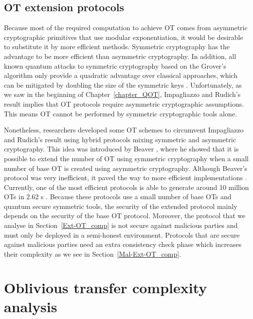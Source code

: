 \subsection{OT extension protocols} \label{Ext-OT}

Because most of the required computation to achieve OT comes from asymmetric cryptographic primitives that use modular exponentiation, it would be desirable to substitute it by more efficient methods. Symmetric cryptography has the advantage to be more efficient than asymmetric cryptography. In addition, all known quantum attacks to symmetric cryptography based on the Grover's algorithm only provide a quadratic advantage over classical approaches, which can be mitigated by doubling the size of the symmetric keys \cite{Bernstein2017}. Unfortunately, as we saw in the beginning of Chapter~\ref{chapter_QOT}, Impagliazzo and Rudich's result \cite{IR99} implies that OT protocols require asymmetric cryptographic assumptions. This means OT cannot be performed by symmetric cryptographic tools alone.

Nonetheless, researchers developed some OT schemes to circumvent Impagliazzo and Rudich's result using hybrid protocols mixing symmetric and asymmetric cryptography. This idea was introduced by Beaver \cite{B96}, where he showed that it is possible to extend the number of OT using symmetric cryptography when a small number of base OT is created using asymmetric cryptography. Although Beaver's protocol was very inefficient, it paved the way to more efficient implementations \cite{IKNP03, N07, NNOB12, ALSZ13, ALSZ15}. Currently, one of the most efficient protocols is able to generate around 10 million OTs in $2.62$ s \cite{ALSZ13}. Because these protocols use a small number of base OTs and quantum secure symmetric tools, the security of the extended protocol mainly depends on the security of the base OT protocol. Moreover, the protocol that we analyse in Section~\ref{Ext-OT_comp} \cite{ALSZ13} is not secure against malicious parties and must only be deployed in a semi-honest environment. Protocols that are secure against malicious parties need an extra consistency check phase which increases their complexity \cite{ALSZ15, KOS15} as we see in Section~\ref{Mal-Ext-OT_comp}.


\section{Oblivious transfer complexity analysis} \label{HQOT_comp}




